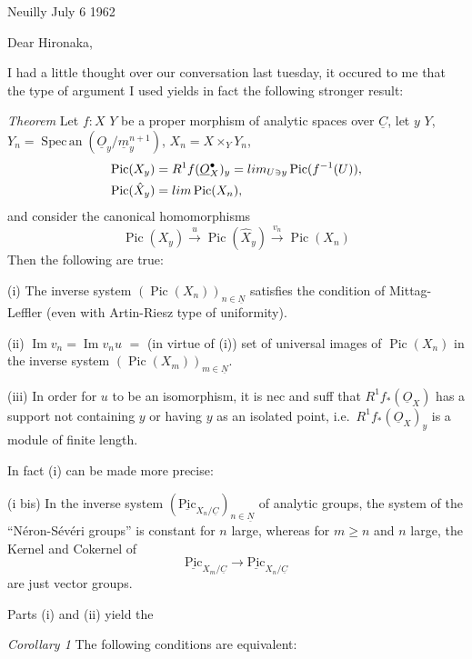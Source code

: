 \documentclass[11pt,a4paper]{article}
\begin{document}
Neuilly July 6 1962

Dear Hironaka,

I had a little thought over our conversation last tuesday, it occured to me
that the type of argument I used yields in fact the following stronger result:

\emph{Theorem} Let $f\colon X$ \supplied{$\to$} $Y$ be a proper morphism of
analytic spaces over $\underline{C}$, let $y$ \supplied{$\in$} $Y$,
$Y_n = \operatorname{Spec\,an}(\underline{O}_y/\underline{m}_y^{n+1})$,
$X_n = X \times_Y Y_n$,
\begin{align*}
\operatorname{Pic}(X_y) &= R^1 f(\underline{O}_X^{\bullet})_y
  = \varinjlim_{U \ni y} \operatorname{Pic}(f^{-1}(U)) ,\\
\operatorname{Pic}(\hat{X}_y) &= \varprojlim \operatorname{Pic}(X_n) ,
\end{align*}
and consider the canonical homomorphisms
\[
\operatorname{Pic}(X_y) \xrightarrow{\ u\ } \operatorname{Pic}(\hat{X}_y)
\xrightarrow{\ v_n\ } \operatorname{Pic}(X_n)
\]
Then the following are true:

(i) The inverse system $(\operatorname{Pic}(X_n))_{n \in \underline{N}}$
satisfies the condition of Mittag-Leffler (even with Artin-Riesz type of
uniformity).

(ii) $\operatorname{Im} v_n = \operatorname{Im} v_n u$ $=$ (in virtue of (i))
set of universal images of $\operatorname{Pic}(X_n)$ in the inverse system
$(\operatorname{Pic}(X_m))_{m \in \underline{N}}$.

(iii) In order for $u$ to be an isomorphism, it is nec and suff that
$R^1 f_*(\underline{O}_X)$ has a support not containing $y$ or having $y$ as
an isolated point, i.e.\ $R^1 f_*(\underline{O}_X)_y$ is a module of finite
length.

In fact (i) can be made more precise:

(i bis) In the inverse system
$(\underline{\mathrm{Pic}}_{X_n/\underline{C}})_{n \in \underline{N}}$ of
analytic groups, the system of the “Néron-Sévéri groups” is constant for $n$
large, whereas for $m \geqslant n$ and $n$ large, the Kernel and Cokernel of
\[
\underline{\mathrm{Pic}}_{X_m/\underline{C}} \to \underline{\mathrm{Pic}}_{X_n/\underline{C}}
\]
are just vector groups.

Parts (i) and (ii) yield the

\emph{Corollary 1} The following conditions are equivalent:
\end{document}
